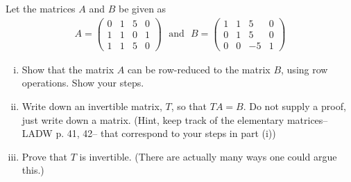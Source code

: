 \begin{question}
    \normalfont

    Let the matrices $A$ and $B$ be given as
    \begin{align*}
        A=
        \begin{pmatrix}
            0 & 1 & 5 & 0 \\
            1 & 1 & 0 & 1 \\
            1 & 1 & 5 & 0
        \end{pmatrix}
        \ \ \ \text{and}\ \ \
        B=
        \begin{pmatrix}
            1 & 1 & 5  & 0 \\
            0 & 1 & 5  & 0 \\
            0 & 0 & -5 & 1
        \end{pmatrix}
    \end{align*}


    \begin{enumerate}[(i)]
        \item Show that the matrix $A$ can be row-reduced to the matrix $B$, using row operations.  Show your steps.

        \item Write down an invertible matrix, $T$, so that $TA=B$.  Do not supply a proof, just write down a matrix.  (Hint, keep track of the elementary matrices-- LADW p. 41, 42-- that correspond to your steps in part (i))

        \item Prove that $T$ is invertible.  (There are actually many ways one could argue this.)
    \end{enumerate}



\end{question}
